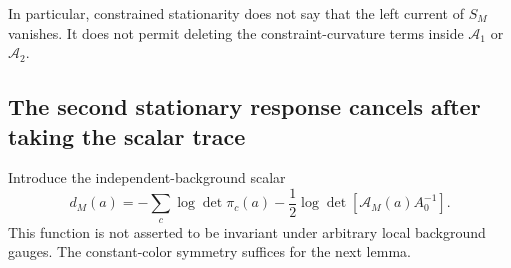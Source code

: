 \documentclass[11pt]{article}
\theoremstyle{remark}
\begin{document}
In particular, constrained stationarity does not say that
the left current of \(S_M\) vanishes. It does not permit
deleting the constraint-curvature terms inside
\(\mathscr A_1\) or \(\mathscr A_2\).

\subsection{The second stationary response cancels after taking the scalar trace}
\label{dmt-color-section}

Introduce the independent-background scalar
\begin{equation}
 d_M(a)=-\sum_c\log\det\pi_c(a)
       -\frac12\log\det[\mathscr A_M(a)A_0^{-1}].
 \label{dmt-independent-scalar}
\end{equation}
This function is not asserted to be invariant under arbitrary
local background gauges. The constant-color symmetry suffices
for the next lemma.
\end{document}
